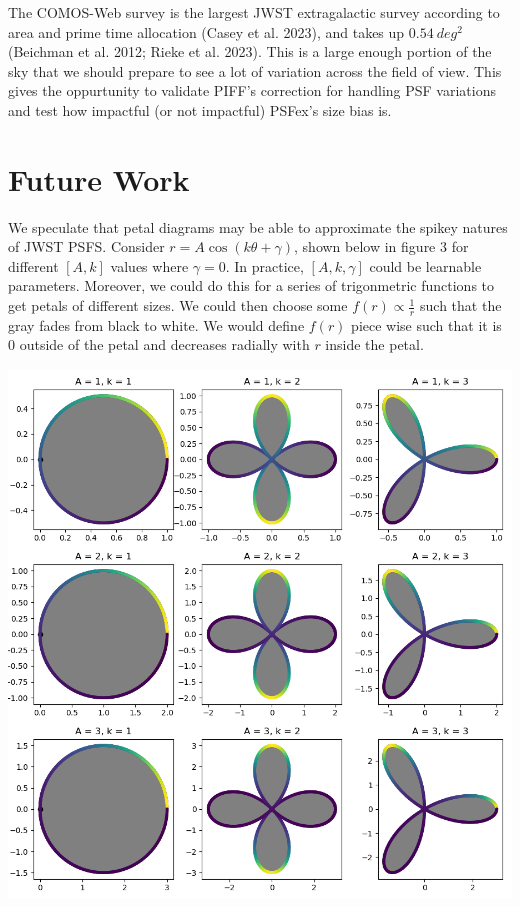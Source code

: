 \documentclass[10pt,a4paper,onecolumn]{article}
\let\origfigure\figure
\let\endorigfigure\endfigure
\renewenvironment{figure}[1][2] {
    \expandafter\origfigure\expandafter[H]
} {
    \endorigfigure
}
\let\textttOrig=\texttt
\def\texttt#1{\expandafter\textttOrig{\seqsplit{#1}}}
\begin{document}
The COMOS-Web survey is the largest JWST extragalactic survey according
to area and prime time allocation (Casey et al. 2023), and takes up
\(0.54 ~deg^2\) (Beichman et al. 2012; Rieke et al. 2023). This is a
large enough portion of the sky that we should prepare to see a lot of
variation across the field of view. This gives \texttt{ShOpt} the
oppurtunity to validate PIFF's correction for handling PSF variations
and test how impactful (or not impactful) PSFex's size bias is.

\hypertarget{future-work}{%
\section{Future Work}\label{future-work}}

We speculate that petal diagrams may be able to approximate the spikey
natures of JWST PSFS. Consider \(r = A \cos(k\theta + \gamma)\), shown
below in figure 3 for different \([A, k]\) values where \(\gamma = 0\).
In practice, \([A, k, \gamma]\) could be learnable parameters. Moreover,
we could do this for a series of trigonmetric functions to get petals of
different sizes. We could then choose some \(f(r) \propto \frac{1}{r}\)
such that the gray fades from black to white. We would define \(f(r)\)
piece wise such that it is \(0\) outside of the petal and decreases
radially with \(r\) inside the petal.

\begin{figure}
\centering
\includegraphics{petals.png}
\caption{Petal Diagram}
\end{figure}
\end{document}
